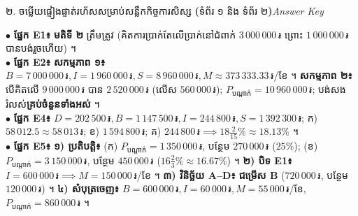 \documentclass[a4paper,10pt]{article}
\newcommand{\en}[1]{{\TimesEn #1}}
\newcommand{\enbf}[1]{{\TimesEn\bfseries #1}}
\newcommand{\riel}{\,\text{៛}}
\newcommand{\secstrip}[2]{%
  \vspace{3pt}%
  \begin{tcolorbox}[
    enhanced, sharp corners, colback=panelgray, colframe=black,
    boxrule=0.8pt, boxsep=0.8pt, top=2pt, bottom=2pt, left=5pt, right=5pt,
    after skip=3pt
  ]
    {\muol\fontsize{8.5pt}{12.2pt}\selectfont #1}\hfill{\fontsize{7.8pt}{10.8pt}\selectfont\textit{#2}}
  \end{tcolorbox}%
}
\begin{document}
\begin{center}
\end{center}

\vspace{4pt}
\secstrip{២. ចម្លើយផ្ទៀងផ្ទាត់រហ័សសម្រាប់សន្លឹកកិច្ចការសិស្ស \enbf{(}ទំព័រ ១ និង ទំព័រ ២\enbf{)}}{\en{Answer Key}}

\begin{tcolorbox}[
  enhanced, sharp corners, colback=white, colframe=black,
  boxrule=0.8pt, boxsep=2pt, top=4pt, bottom=4pt, left=6pt, right=6pt
]
  \fontsize{9.0pt}{13.6pt}\selectfont
  $\bullet$ \textbf{ផ្នែក \en{E1}៖} \textbf{មតិទី ២} ត្រឹមត្រូវ (គិតការប្រាក់តែលើប្រាក់នៅជំពាក់ $3\,000\,000\riel$ ព្រោះ $1\,000\,000\riel$ បានបង់រួចហើយ) ។\\[2pt]
  $\bullet$ \textbf{ផ្នែក \en{E2}៖} \textbf{សកម្មភាព ១៖} $B = 7\,000\,000\riel, I = 1\,960\,000\riel, S = 8\,960\,000\riel, M \approx 373\,333.33\riel$/ខែ ។ \textbf{សកម្មភាព ២៖} បើគិតលើ $9\,000\,000\riel$ បាន $2\,520\,000\riel$ (លើស $560\,000\riel$); $P_{\text{បណ្ដាក់}} = 10\,960\,000\riel$; បង់សងរំលស់\textbf{គ្រប់ចំនួនទាំងអស់} ។\\[2pt]
  $\bullet$ \textbf{ផ្នែក \en{E4}៖} $D = 202\,500\riel, B = 1\,147\,500\riel, I = 244\,800\riel, S = 1\,392\,300\riel$; ក) $58\,012.5 \approx 58\,013\riel$; ខ) $1\,594\,800\riel$; គ) $244\,800\riel \implies 18\frac{2}{15}\% \approx 18.13\%$ ។\\[2pt]
  $\bullet$ \textbf{ផ្នែក \en{E5}៖} \textbf{១) ប្រតិបត្តិ៖} (ក) $P_{\text{បណ្ដាក់}} = 1\,350\,000\riel$, បន្ថែម $270\,000\riel$ ($25\%$); (ខ) $P_{\text{បណ្ដាក់}} = 3\,150\,000\riel$, បន្ថែម $450\,000\riel$ ($16\frac{2}{3}\% \approx 16.67\%$) ។ \textbf{២) បិទ \en{E1}៖} $I = 600\,000\riel \implies M = 150\,000\riel$/ខែ ។ \textbf{៣) វិនិច្ឆ័យ \en{A--D}៖} \textbf{ជម្រើស \en{B}} ($720\,000\riel$, បន្ថែម $120\,000\riel$) ។ \textbf{៤) សំបុត្រចេញ៖} $B = 600\,000\riel, I = 60\,000\riel, M = 55\,000\riel$/ខែ, $P_{\text{បណ្ដាក់}} = 860\,000\riel$ ។
\end{tcolorbox}
\end{document}
